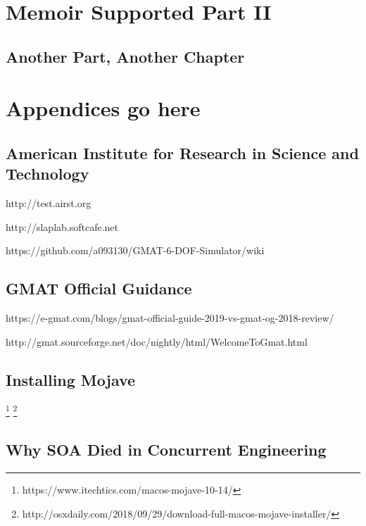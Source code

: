\documentclass[
  a4paper, %
  11pt, %
  twoside,    %
  onecolumn,  %
  openright,  %
]{memoir}
\begin{document}
\part{Memoir Supported Part II}

\chapter{Another Part, Another Chapter}


\appendix

\part{Appendices go here}

\chapter{American Institute for Research in Science and Technology} %
\label{cha:airst}

http://test.airst.org

http://slaplab.softcafe.net

https://github.com/a093130/GMAT-6-DOF-Simulator/wiki


\chapter{GMAT Official Guidance} %
\label{cha:gmat_official_guidance}

https://e-gmat.com/blogs/gmat-official-guide-2019-vs-gmat-og-2018-review/

http://gmat.sourceforge.net/doc/nightly/html/WelcomeToGmat.html


\chapter{Installing Mojave} %
\label{cha:installing_mojave}

\footnote{https://www.itechtics.com/macos-mojave-10-14/}
\footnote{http://osxdaily.com/2018/09/29/download-full-macos-mojave-installer/}


\chapter{Why SOA Died in Concurrent Engineering}
\end{document}
